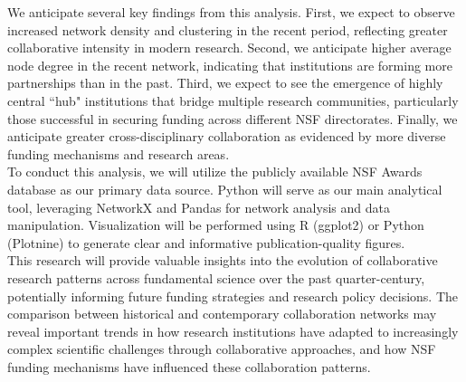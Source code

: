 \documentclass[10pt,twocolumn]{article}
\begin{document}
We anticipate several key findings from this analysis. First, we expect to observe increased network density and clustering in the recent period, reflecting greater 
collaborative intensity in modern research. Second, we anticipate higher average node degree in the recent network, indicating that institutions are forming more partnerships 
than in the past. Third, we expect to see the emergence of highly central ``hub" institutions that bridge multiple research communities, particularly those successful in 
securing funding across different NSF directorates. Finally, we anticipate greater cross-disciplinary collaboration as evidenced by more diverse funding mechanisms and research areas.\\

To conduct this analysis, we will utilize the publicly available NSF Awards database as our primary data source. Python will serve as our main analytical tool,
leveraging NetworkX and Pandas for network analysis and data manipulation. Visualization will be performed using R (ggplot2) or Python (Plotnine) to generate clear
and informative publication-quality figures. \\

This research will provide valuable insights into the evolution of collaborative research patterns across fundamental science over the past quarter-century, 
potentially informing future funding strategies and research policy decisions. The comparison between historical and contemporary collaboration networks may 
reveal important trends in how research institutions have adapted to increasingly complex scientific challenges through collaborative approaches, and how NSF 
funding mechanisms have influenced these collaboration patterns.\\
\end{document}
